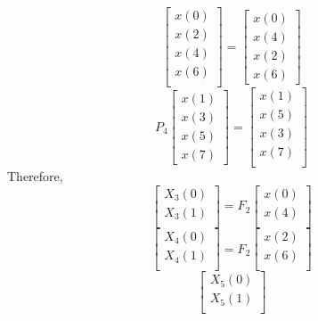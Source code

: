 \documentclass[journal,12pt,twocolumn]{IEEEtran}
\numberwithin{equation}{section}
\renewcommand\thesection{\arabic{section}}
\begin{document}
\begin{enumerate}[label=\arabic*.,ref=\thesection.\theenumi]
\begin{equation}
\begin{bmatrix}
x(0) \\ 
x(2) \\ 
x(4) \\ 
x(6) \\
\end{bmatrix}
 = 
\begin{bmatrix}
x(0) \\ 
x(4) \\ 
x(2) \\
x(6)
\end{bmatrix}
\end{equation}
\begin{equation}
P_{4}
\begin{bmatrix}
x(1) \\ 
x(3) \\ 
x(5) \\
x(7)
\end{bmatrix}
 = 
\begin{bmatrix}
x(1) \\ 
x(5) \\ 
x(3) \\ 
x(7) \\
\end{bmatrix}
\end{equation}
Therefore,
\begin{equation}
\begin{bmatrix}
X_{3}(0) \\ 
X_{3}(1)\\ 
\end{bmatrix}
= F_{2}
\begin{bmatrix}
x(0) \\ 
x(4) \\ 
\end{bmatrix}
\end{equation}
\begin{equation}
\begin{bmatrix}
X_{4}(0) \\ 
X_{4}(1)\\ 
\end{bmatrix}
= F_{2}
\begin{bmatrix}
x(2) \\ 
x(6) \\ 
\end{bmatrix}
\end{equation}
\begin{equation}
\begin{bmatrix}
X_{5}(0) \\ 
X_{5}(1)\\ 
\end{bmatrix}

\end{equation}
\end{enumerate}
\end{document}
